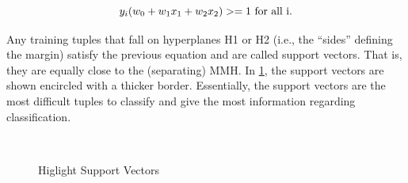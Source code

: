 \documentclass[12pt,fleqn]{book} %
\begin{document}
\begin{dBox}
\begin{equation}
y_{i}(w_0 + w_1 x_1 + w_2 x_2) >= 1 $ for all i$. 
\end{equation}
\end{dBox}
\bigskip
Any training tuples that fall on hyperplanes H1 or H2 (i.e., the “sides” defining the margin) satisfy the previous equation and are called support vectors. That is, they are equally close to the (separating) MMH. In \ref{fig:svm3}, the support vectors are shown encircled with a thicker border. Essentially, the support vectors are the most difficult tuples to classify and give the most information regarding classification.\bigskip
\bigskip
\begin{figure}[h]
\begin{dBox}
\centering
  \mbox{
   }
   \caption{Higlight Support Vectors\label{fig:svm3} }   
\end{dBox}   
\end{figure}
\end{document}
